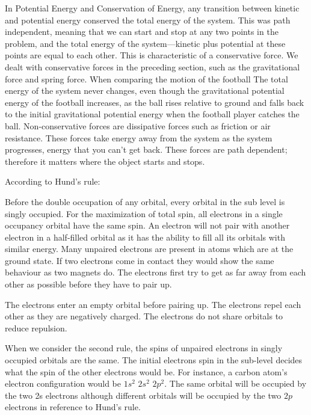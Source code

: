 \begin{phybox}{}
{In Potential Energy and Conservation of Energy, any transition between kinetic and potential energy conserved the total energy of the system. This was path independent, meaning that we can start and stop at any two points in the problem, and the total energy of the system—kinetic plus potential at these points are equal to each other. This is characteristic of a conservative force. We dealt with conservative forces in the preceding section, such as the gravitational force and spring force. When comparing the motion of the football}
{The total energy of the system never changes, even though the gravitational potential energy of the football increases, as the ball rises relative to ground and falls back to the initial gravitational potential energy when the football player catches the ball. Non-conservative forces are dissipative forces such as friction or air resistance. These forces take energy away from the system as the system progresses, energy that you can’t get back. These forces are path dependent; therefore it matters where the object starts and stops.}
\end{phybox}
\begin{chembox}{}
{According to Hund’s rule:

Before the double occupation of any orbital, every orbital in the sub level is singly occupied.
For the maximization of total spin, all electrons in a single occupancy orbital have the same spin.
An electron will not pair with another electron in a half-filled orbital as it has the ability to fill all its orbitals with similar energy. Many unpaired electrons are present in atoms which are at the ground state. If two electrons come in contact they would show the same behaviour as two magnets do. The electrons first try to get as far away from each other as possible before they have to pair up.

The electrons enter an empty orbital before pairing up. The electrons repel each other as they are negatively charged. The electrons do not share orbitals to reduce repulsion.

When we consider the second rule, the spins of unpaired electrons in singly occupied orbitals are the same. The initial electrons spin in the sub-level decides what the spin of the other electrons would be. For instance, a carbon atom’s electron configuration would be $1s^2$ $2s^2$ $2p^2$. The same orbital will be occupied by the two 2s electrons although different orbitals will be occupied by the two $2p$ electrons in reference to Hund’s rule.}
\end{chembox}
